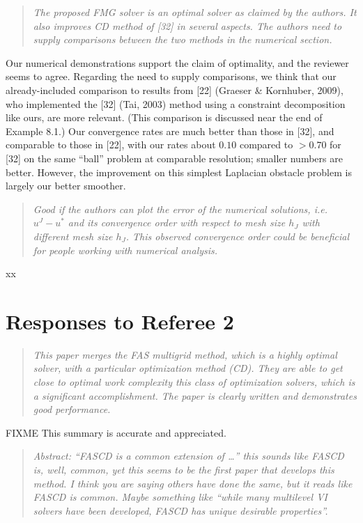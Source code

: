 \documentclass[letterpaper,final,12pt,reqno]{amsart}
\newenvironment{review}%
{\bigskip \par \begin{quote} \selectfont \sl}%
{\end{quote}}
\newcommand\short[1]{\medskip\noindent #1}   %
\begin{document}
\begin{review}
The proposed FMG solver is an optimal solver as claimed by the authors. It also improves CD method of [32] in several aspects. The authors need to supply comparisons between the two methods in the numerical section.
\end{review}

\short{Our numerical demonstrations support the claim of optimality, and the reviewer seems to agree.  Regarding the need to supply comparisons, we think that our already-included comparison to results from [22] (Graeser \& Kornhuber, 2009), who implemented the [32] (Tai, 2003) method using a constraint decomposition like ours, are more relevant.  (This comparison is discussed near the end of Example 8.1.)  Our convergence rates are much better than those in [32], and comparable to those in [22], with our rates about $0.10$ compared to $>0.70$ for [32] on the same ``ball'' problem at comparable resolution; smaller numbers are better.  However, the improvement on this simplest Laplacian obstacle problem is largely our better smoother.}

\begin{review}
Good if the authors can plot the error of the numerical solutions, i.e. $u^J - u^*$ and its convergence order with respect to mesh size $h_J$ with different mesh size $h_J$. This observed convergence order could be beneficial for people working with numerical analysis.
\end{review}

\short{xx}


\section{Responses to Referee 2}

\begin{review}
This paper merges the FAS multigrid method, which is a highly optimal solver, with a particular optimization method (CD).  They are able to get close to optimal work complexity this class of optimization solvers, which is a significant accomplishment.  The paper is clearly written and demonstrates good performance.
\end{review}

\short{FIXME This summary is accurate and appreciated.}

\begin{review}
Abstract: ``FASCD is a common extension of \dots'' this sounds like FASCD is, well, common, yet this seems to be the first paper that develops this method.  I think you are saying others have done the same, but it reads like FASCD is common.  Maybe something like ``while many multilevel VI solvers have been developed, FASCD has unique desirable properties''.
\end{review}
\end{document}
